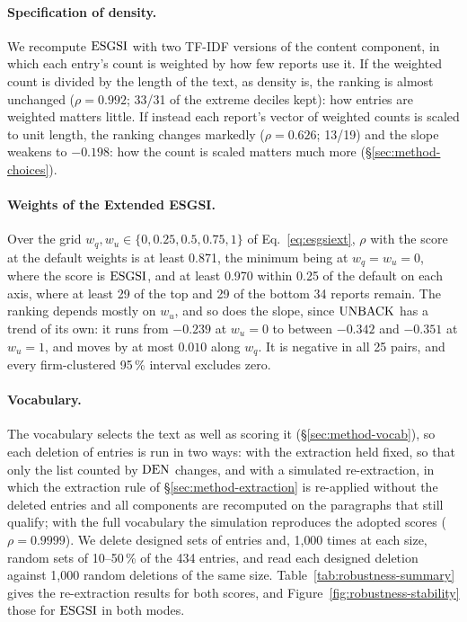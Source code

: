 \paragraph{Specification of density.} We recompute $\mathrm{ESGSI}$ with two TF-IDF
versions of the content component, in which each entry's count is weighted by how few
reports use it. If the weighted count is divided by the length of the text, as
density is, the ranking is almost unchanged ($\rho = 0.992$; 33/31 of the
extreme deciles kept): how entries are weighted matters little. If instead
each report's vector of weighted counts is scaled to unit length, the ranking
changes markedly ($\rho = 0.626$; 13/19)
and the slope weakens to $-0.198$: how the count is scaled matters much more
(\S\ref{sec:method-choices}).

\paragraph{Weights of the Extended ESGSI.} Over the grid
$w_q, w_u \in \{0, 0.25, 0.5, 0.75, 1\}$ of Eq.~\eqref{eq:esgsiext}, $\rho$
with the score at the default weights is at least 0.871, the minimum being at
$w_q = w_u = 0$, where the score is $\mathrm{ESGSI}$, and at least 0.970 within 0.25
of the default on each axis, where at least 29 of the top and 29 of the
bottom 34 reports remain. The ranking depends mostly on $w_u$, and so does the
slope, since $\mathrm{UNBACK}$ has a trend of its own: it runs from $-0.239$ at
$w_u = 0$ to between $-0.342$ and $-0.351$ at $w_u = 1$, and moves by at most
$0.010$ along $w_q$. It is negative in all 25 pairs, and every firm-clustered
95\,\% interval excludes zero.

\paragraph{Vocabulary.} The vocabulary selects the text as well as scoring it
(\S\ref{sec:method-vocab}), so each deletion of entries is run in two ways:
with the extraction held fixed, so that only the list counted by $\mathrm{DEN}$
changes, and with a simulated re-extraction, in which the extraction rule of
\S\ref{sec:method-extraction} is re-applied without the deleted entries and
all components are recomputed on the paragraphs that still qualify; with the
full vocabulary the simulation reproduces the adopted scores
($\rho = 0.9999$). We delete designed sets of entries and,
1{,}000 times at each size, random sets of 10--50\,\% of the 434 entries, and
read each designed deletion against 1{,}000 random deletions of the same size.
Table~\ref{tab:robustness-summary} gives the re-extraction results for both
scores, and Figure~\ref{fig:robustness-stability} those for $\mathrm{ESGSI}$ in both
modes.

